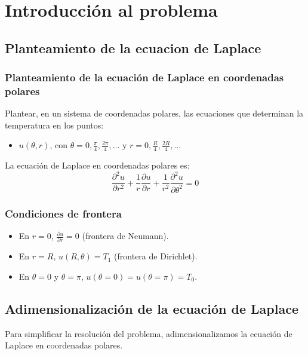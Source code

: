 \chapter{Introducción al problema}

\section{Planteamiento de la ecuacion de Laplace}

\subsection{Planteamiento de la ecuación de Laplace en coordenadas polares}

Plantear, en un sistema de coordenadas polares, las ecuaciones que determinan la temperatura en los puntos:

\begin{itemize}
    \item \(u(\theta,r)\), con \(\theta = 0, \frac{\pi}{4}, \frac{2\pi}{4}, \dots\) y \(r = 0, \frac{R}{4}, \frac{2R}{4}, \dots\)
\end{itemize}

La ecuación de Laplace en coordenadas polares es:
\begin{equation}
    \frac{\partial^2 u}{\partial r^2} + \frac{1}{r}\frac{\partial u}{\partial r} + \frac{1}{r^2}\frac{\partial^2 u}{\partial \theta^2} = 0
\end{equation}

\subsection{Condiciones de frontera}
\begin{itemize}
    \item En \(r = 0\), \(\frac{\partial u}{\partial r} = 0\) (frontera de Neumann).
    \item En \(r = R\), \(u(R, \theta) = T_1\) (frontera de Dirichlet).
    \item En \(\theta = 0\) y \(\theta = \pi\), \(u(\theta = 0) = u(\theta = \pi) = T_0\).
\end{itemize}

\section{Adimensionalización de la ecuación de Laplace}

Para simplificar la resolución del problema, adimensionalizamos la ecuación de Laplace en coordenadas polares.

